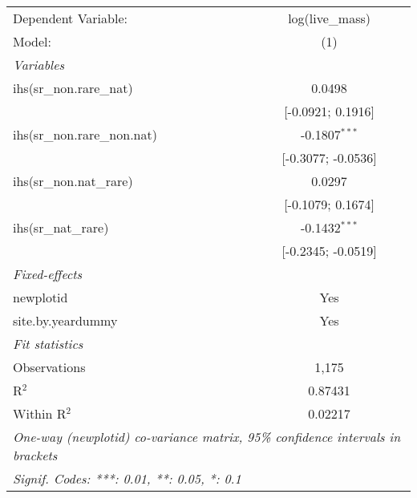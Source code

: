 \begin{tabular}{lc}
\tabularnewline\midrule\midrule
Dependent Variable:&log(live\_mass)\\
Model:&(1)\\
\midrule \emph{Variables}&  \\
ihs(sr\_non.rare\_nat)&0.0498\\
  &[-0.0921; 0.1916]\\
ihs(sr\_non.rare\_non.nat)&-0.1807$^{***}$\\
  &[-0.3077; -0.0536]\\
ihs(sr\_non.nat\_rare)&0.0297\\
  &[-0.1079; 0.1674]\\
ihs(sr\_nat\_rare)&-0.1432$^{***}$\\
  &[-0.2345; -0.0519]\\
\midrule \emph{Fixed-effects}&  \\
newplotid & Yes\\
site.by.yeardummy & Yes\\
\midrule \emph{Fit statistics}&  \\
Observations & 1,175\\
R$^2$ & 0.87431\\
Within R$^2$ & 0.02217\\
\midrule\midrule\multicolumn{2}{l}{\emph{One-way (newplotid) co-variance matrix, 95\% confidence intervals in brackets}}\\
\multicolumn{2}{l}{\emph{Signif. Codes: ***: 0.01, **: 0.05, *: 0.1}}\\
\end{tabular}


